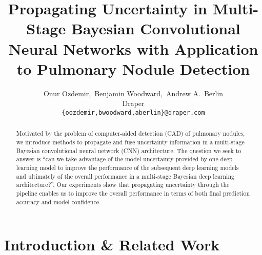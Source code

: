 \documentclass{article}
\title{Propagating Uncertainty in Multi-Stage Bayesian Convolutional Neural Networks with Application to Pulmonary Nodule Detection}
\author{
  Onur Ozdemir,\, Benjamin Woodward,\, Andrew A.~Berlin \\
  Draper\\
  \texttt{\{oozdemir,bwoodward,aberlin\}@draper.com} \vspace{-.4cm}
}
\begin{document}

\maketitle

\begin{abstract}
	Motivated by the problem of computer-aided detection (CAD) of pulmonary nodules, we introduce methods to propagate and fuse uncertainty information in a multi-stage Bayesian convolutional neural network (CNN) architecture. The question we seek to answer is ``can we take advantage of the model uncertainty provided by one deep learning model to improve the performance of the subsequent deep learning models and ultimately of the overall performance in a multi-stage Bayesian deep learning architecture?''. Our experiments show that propagating uncertainty through the pipeline enables us to improve the overall performance in terms of both final prediction accuracy and model confidence.
\end{abstract}

\section{Introduction  \& Related Work}\label{sec:bayesnet}

\end{document}
